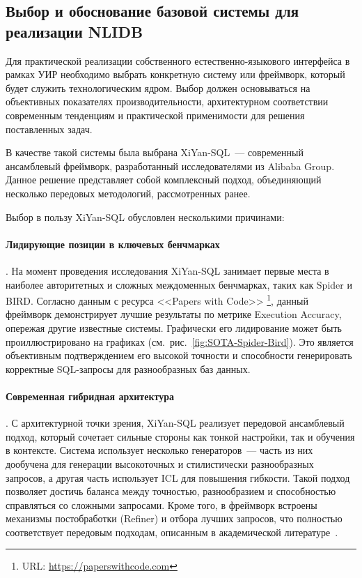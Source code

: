 \subsection{Выбор и обоснование базовой системы для реализации NLIDB}
Для практической реализации собственного естественно-языкового интерфейса в рамках
УИР необходимо выбрать конкретную систему или фреймворк,
который будет служить технологическим ядром. Выбор должен основываться на
объективных показателях производительности, архитектурном соответствии современным
тенденциям и практической применимости для решения поставленных задач.

В качестве такой системы была выбрана XiYan-SQL~--- современный ансамблевый фреймворк,
разработанный исследователями из Alibaba Group\cite{gaoPreviewXiYanSQLMultiGenerator2025}.
Данное решение представляет собой комплексный подход,
объединяющий несколько передовых методологий, рассмотренных ранее.

Выбор в пользу XiYan-SQL обусловлен несколькими причинами:

\paragraph{Лидирующие позиции в ключевых бенчмарках}. На момент проведения исследования XiYan-SQL
занимает первые места в наиболее авторитетных и сложных междоменных бенчмарках,
таких как Spider и BIRD.
Согласно данным с ресурса <<Papers with Code>>
\footnote{URL: \url{https://paperswithcode.com}}, данный фреймворк демонстрирует
лучшие результаты по метрике Execution Accuracy,
опережая другие известные системы. Графически его лидирование может быть проиллюстрировано
на графиках (см.~рис.~\ref{fig:SOTA-Spider-Bird}).
Это является объективным подтверждением
его высокой точности и способности генерировать корректные SQL-запросы
для разнообразных баз данных.

\paragraph{Современная гибридная архитектура}. С архитектурной точки зрения,
XiYan-SQL реализует передовой ансамблевый подход,
который сочетает сильные стороны как тонкой настройки,
так и обучения в контексте.
Система использует несколько генераторов~--- часть из них дообучена
для генерации высокоточных и стилистически разнообразных запросов,
а другая часть использует ICL для повышения гибкости.
Такой подход позволяет достичь баланса между точностью,
разнообразием и способностью справляться со сложными запросами.
Кроме того, в фреймворк встроены механизмы постобработки (Refiner) и
отбора лучших запросов, что полностью соответствует передовым подходам,
описанным в академической литературе~\cite{gaoPreviewXiYanSQLMultiGenerator2025,
      huangExploringLandscapeTexttoSQL2025}.


